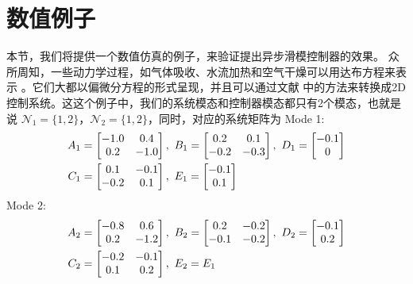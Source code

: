 \section{数值例子} \label{example}
	本节，我们将提供一个数值仿真的例子，来验证提出异步滑模控制器的效果。  众所周知，一些动力学过程，如气体吸收、水流加热和空气干燥可以用达布方程来表示 \cite{marszalek1984two}。它们大都以偏微分方程的形式呈现，并且可以通过文献 \cite{du2001h}中的方法来转换成2D控制系统。这这个例子中，我们的系统模态和控制器模态都只有2个模态，也就是说 $\mathcal{N}_1=\{1,2\}$，$ \mathcal{N}_{2}=\{1,2\}$，同时，对应的系统矩阵为
	Mode 1:
	\begin{equation} \notag
	\begin{aligned}
	A_{1} &= \begin{bmatrix}
	-1.0&0.4\\
	0.2&-1.0
	\end{bmatrix}, \ 
	B_{1} = \begin{bmatrix}
	0.2&0.1\\ -0.2&-0.3
	\end{bmatrix} ,\ 
	D_{1} = \begin{bmatrix}
	-0.1\\0
	\end{bmatrix} \\
	C_{1} &= \begin{bmatrix}
	0.1&-0.1\\-0.2&0.1
	\end{bmatrix},\ 
	E_{1} = \begin{bmatrix}
	-0.1\\ 0.1
	\end{bmatrix}
	\end{aligned}  
	\end{equation}
	Mode 2:
	\begin{equation} \notag
	\begin{aligned}
	A_{2} &=\begin{bmatrix}
	-0.8&0.6\\
	0.2&-1.2
	\end{bmatrix}, \ 
	B_{2} = \begin{bmatrix}
	0.2&-0.2\\ -0.1&-0.2
	\end{bmatrix} ,\ 
	D_{2} = \begin{bmatrix}
	-0.1\\0.2
	\end{bmatrix} \\
	C_{2} &= \begin{bmatrix}
	-0.2&-0.1\\0.1&0.2
	\end{bmatrix},\
	E_{2} = E_{1}
	\end{aligned}  
	\end{equation}
